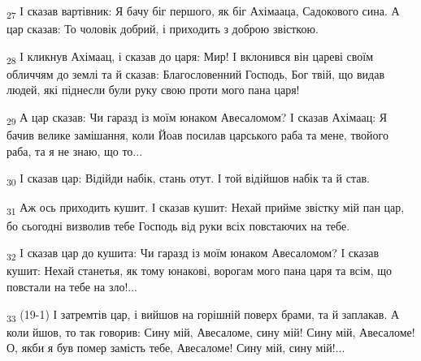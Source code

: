 \begin{tcolorbox}
\textsubscript{27} І сказав вартівник: Я бачу біг першого, як біг Ахімааца, Садокового сина. А цар сказав: То чоловік добрий, і приходить з доброю звісткою.
\end{tcolorbox}
\begin{tcolorbox}
\textsubscript{28} І кликнув Ахімаац, і сказав до царя: Мир! І вклонився він цареві своїм обличчям до землі та й сказав: Благословенний Господь, Бог твій, що видав людей, які піднесли були руку свою проти мого пана царя!
\end{tcolorbox}
\begin{tcolorbox}
\textsubscript{29} А цар сказав: Чи гаразд із моїм юнаком Авесаломом? І сказав Ахімаац: Я бачив велике замішання, коли Йоав посилав царського раба та мене, твойого раба, та я не знаю, що то...
\end{tcolorbox}
\begin{tcolorbox}
\textsubscript{30} І сказав цар: Відійди набік, стань отут. І той відійшов набік та й став.
\end{tcolorbox}
\begin{tcolorbox}
\textsubscript{31} Аж ось приходить кушит. І сказав кушит: Нехай прийме звістку мій пан цар, бо сьогодні визволив тебе Господь від руки всіх повстаючих на тебе.
\end{tcolorbox}
\begin{tcolorbox}
\textsubscript{32} І сказав цар до кушита: Чи гаразд із моїм юнаком Авесаломом? І сказав кушит: Нехай станетья, як тому юнакові, ворогам мого пана царя та всім, що повстали на тебе на зло!...
\end{tcolorbox}
\begin{tcolorbox}
\textsubscript{33} (19-1) І затремтів цар, і вийшов на горішній поверх брами, та й заплакав. А коли йшов, то так говорив: Сину мій, Авесаломе, сину мій! Сину мій, Авесаломе! О, якби я був помер замість тебе, Авесаломе! Сину мій, сину мій!...
\end{tcolorbox}
